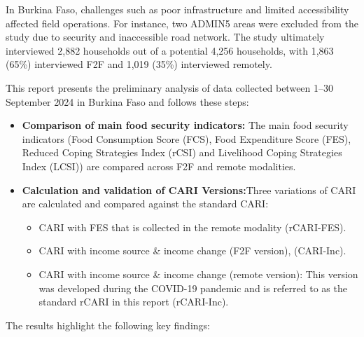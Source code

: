 \documentclass[11pt,harvard]{article}
\begin{document}
	In Burkina Faso, challenges such as poor infrastructure and limited accessibility affected field operations. For instance, two ADMIN5 areas were excluded from the study due to security and inaccessible road network. The study ultimately interviewed 2,882 households out of a potential 4,256 households, with 1,863 (65\%) interviewed F2F and 1,019 (35\%) interviewed remotely.

	This report presents the preliminary analysis of data collected between 1–30 September 2024 in Burkina Faso and follows these steps:

	\begin{itemize}
		\item\textbf{Comparison of main food security indicators:} The main food security indicators (Food Consumption Score (FCS), Food Expenditure Score (FES), Reduced Coping Strategies Index (rCSI) and Livelihood Coping Strategies Index (LCSI)) are compared across F2F and remote modalities.
		\item\textbf{Calculation and validation of CARI Versions:}Three variations of CARI are calculated and compared against the standard CARI:
		\begin{itemize}
			\item[1.] CARI with FES that is collected in the remote modality (rCARI-FES).
			\item[2.] CARI with income source \& income change (F2F version), (CARI-Inc).
			\item[3.] CARI with income source \& income change (remote version): This version was developed during the COVID-19 pandemic and is referred to as the standard rCARI in this report (rCARI-Inc).
		\end{itemize}
	\end{itemize}

		
	The results highlight the following key findings:
	 
\end{document}
